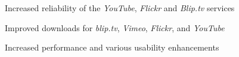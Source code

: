 \begin{changelog}
\item Increased reliability of the \emph{YouTube}, \emph{Flickr} and \emph{Blip.tv} services
\end{changelog}

\begin{changelog}
\item Improved downloads for \emph{blip.tv}, \emph{Vimeo}, \emph{Flickr}, and \emph{YouTube}
\end{changelog}

\begin{changelog}
\item Increased performance and various usability enhancements
\end{changelog}
